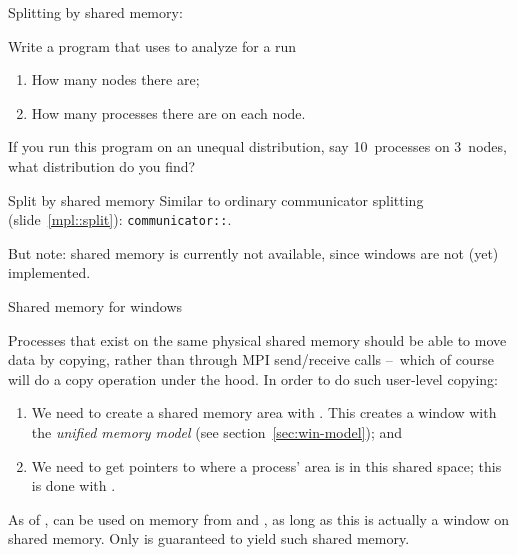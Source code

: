 Splitting by shared memory:
%
\begingroup
\def\snippetcodefraction{.45}
\def\snippettextfraction{.5}
\endgroup

\begin{exercise}
  \label{ex:mpi-node-proc-split}
  Write a program that uses 
  to  analyze for a run
  \begin{enumerate}
  \item How many nodes there are;
  \item How many processes there are on each node.
  \end{enumerate}
  If you run this program on an unequal distribution,
  say 10~processes on 3~nodes, what distribution do you find?
  
\end{exercise}

\begin{mplnote}{Split by shared memory}
  Similar to ordinary communicator splitting
  (slide~\ref{mpl::split}):
  \lstinline+communicator::+.

  But note: shared memory is currently not available,
  since windows are not (yet) implemented.
\end{mplnote}

 {Shared memory for windows}

Processes that exist on the same physical shared memory should be able
to move data by copying, rather than through MPI send/receive calls
--~which of course will do a copy operation under the hood.
In order to do such user-level copying:
\begin{enumerate}
\item We need to create a shared memory area with
  .
  This creates a window with the
  \emph{unified memory model}
  (see section~\ref{sec:win-model});
  and
\item We need to get pointers to where a process' area is in this
  shared space; this is done with .
\end{enumerate}

\begin{remark}
  As of , 
  can be used on memory from 
  and ,
  as long as this is actually a window on shared memory.
  Only  is guaranteed
  to yield such shared memory.
\end{remark}

